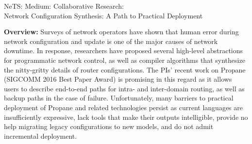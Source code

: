 \documentclass[12pt]{article}
\makeatletter
\newcommand{\Propane}{{\sc Propane}\@\xspace}
\makeatother
\begin{document}
\setcounter{page}{1}

 \begin{large}
\begin{center}
NeTS: Medium: Collaborative Research: \\
Network Configuration Synthesis: A Path to Practical Deployment
\end{center}
\end{large}

\noindent
\textbf{Overview:} 
Surveys of network operators have shown that human error during
network configuration and update is one of the major causes of network
downtime.  
In response, researchers have proposed several
high-level abstractions for programmatic network control, as well
as compiler algorithms that synthesize the nitty-gritty details
of router configurations.  The PIs' recent work on \Propane 
(SIGCOMM 2016 Best Paper Award) is promising in this regard
as it allows users to describe end-to-end paths for intra- and
inter-domain routing, as well as backup paths in the case of 
failure.  Unfortunately, many barriers to practical deployment of \Propane
and related technologies persist as current languages are insufficiently
expressive, lack tools that make their outputs intelligible, 
provide no help migrating legacy configurations to new models, and
do not admit incremental deployment.
\end{document}
